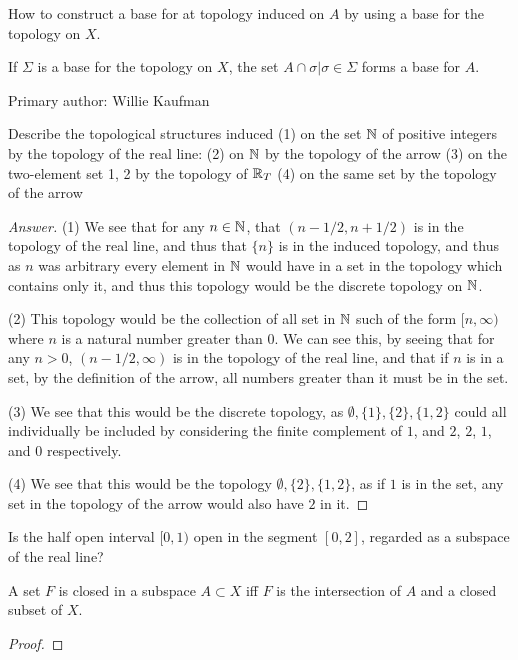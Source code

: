 \begin{minorEx}[Riddle]%
How to construct a base for at topology induced on $A$ by using a base for the topology on $X$.
\end{minorEx}
If $\Sigma$ is a base for the topology on $X$, the set ${A \cap \sigma | \sigma \in \Sigma}$ forms a base for $A$. 

Primary author: Willie Kaufman

\begin{minorEx}%
Describe the topological structures induced
(1) on the set $\mathbb{N}$ of positive integers by the topology of the real line:
(2) on $\mathbb{N}$ by the topology of the arrow
(3) on the two-element set {1, 2} by the topology of $\mathbb{R}_T$
(4) on the same set by the topology of the arrow
\end{minorEx}

\begin{proof}[Answer]
  (1) We see that for any $n\in \mathbb{N}$, that $(n-1/2, n+1/2)$ is in the
  topology of the real line, and thus that $\{n\}$ is in the induced
  topology, and thus as $n$ was arbitrary every element in $\mathbb{N}$ would
  have in a set in the topology which contains only it, and thus this
  topology would be the discrete topology on $\mathbb{N}$.

  (2) This topology would be the collection of all set in $\mathbb{N}$ such
  of the form $[n, \infty)$ where $n$ is a natural number greater than
  $0$. We can see this, by seeing that for any $n>0$, $(n-1/2,\infty)$
  is in the topology of the real line, and that if $n$ is in a set, by
  the definition of the arrow, all numbers greater than it must be in
  the set.
  
  (3) We see that this would be the discrete topology, as
  $\emptyset,\{1\},\{2\}, \{1,2\}$ could all individually be included
    by considering the finite complement of $1$, and $2$, $2$, $1$,
    and $0$ respectively.

  (4) We see that this would be the topology $\emptyset,\{2\},
  \{1,2\}$, as if $1$ is in the set, any set in the topology of the
  arrow would also have $2$ in it.
\end{proof}

\begin{minorEx}%
Is the half open interval $[0, 1)$ open in the segment $[0, 2]$, regarded as a subspace of the real line?
\end{minorEx}

\begin{majorEx}%
A set $F$ is closed in a subspace $A \subset X$ iff $F$ is the intersection of $A$ and a closed subset of $X$.
\end{majorEx}
\begin{proof}
\end{proof}

